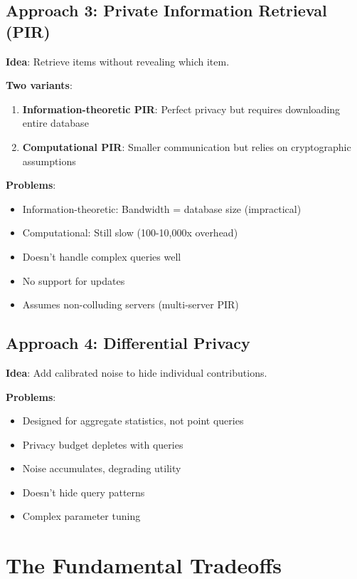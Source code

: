 \subsection{Approach 3: Private Information Retrieval (PIR)}

\textbf{Idea}: Retrieve items without revealing which item.

\textbf{Two variants}:
\begin{enumerate}
\item \textbf{Information-theoretic PIR}: Perfect privacy but requires downloading entire database
\item \textbf{Computational PIR}: Smaller communication but relies on cryptographic assumptions
\end{enumerate}

\textbf{Problems}:
\begin{itemize}
\item Information-theoretic: Bandwidth = database size (impractical)
\item Computational: Still slow (100-10,000x overhead)
\item Doesn't handle complex queries well
\item No support for updates
\item Assumes non-colluding servers (multi-server PIR)
\end{itemize}

\subsection{Approach 4: Differential Privacy}

\textbf{Idea}: Add calibrated noise to hide individual contributions.

\textbf{Problems}:
\begin{itemize}
\item Designed for aggregate statistics, not point queries
\item Privacy budget depletes with queries
\item Noise accumulates, degrading utility
\item Doesn't hide query patterns
\item Complex parameter tuning
\end{itemize}

\section{The Fundamental Tradeoffs}

